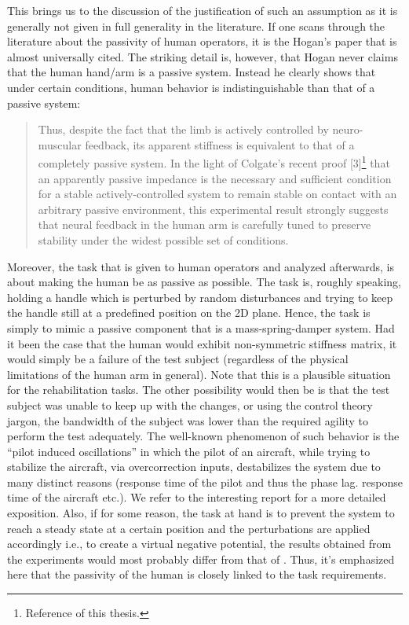 This brings us to the discussion of the justification of such an assumption as it is generally not given in full generality in the
literature. If one scans through the literature about the passivity of human operators, it is the Hogan's paper \cite{hogan89}
that is almost universally cited. The striking detail is, however, that Hogan never claims that the human hand/arm is a passive
system. Instead he clearly shows that under certain conditions, human behavior is indistinguishable than that of a 
passive system: 
\begin{quote}
Thus, despite the fact that the
limb is actively controlled by neuro-muscular feedback, its apparent
stiffness is equivalent to that of a completely passive
system. In the light of Colgate's recent proof [3]\footnote{Reference 
\cite{colgatehogan88} of this thesis.} that an
apparently passive impedance is the necessary and sufficient
condition for a stable actively-controlled system to remain stable
on contact with an arbitrary passive environment, this
experimental result strongly suggests that neural feedback in the
human arm is carefully tuned to preserve stability under the
widest possible set of conditions.
\end{quote}
Moreover, the task that is given to human operators and analyzed afterwards, is about making the human 
be as passive as possible. The task is, roughly speaking, holding a handle which is perturbed by random disturbances and 
trying to keep the handle still at a predefined position on the 2D plane. Hence, the task is simply to mimic a passive 
component that is a mass-spring-damper system. Had it been the case that the human would exhibit non-symmetric 
stiffness matrix, it would simply be a failure of the test subject (regardless of the physical limitations of the human arm in general). Note that this 
is a plausible situation for the rehabilitation tasks. The other possibility would then be is that the test subject was unable to keep up 
with the changes, or using the control theory jargon, the bandwidth of the subject was lower than the required agility to 
perform the test adequately.  The well-known phenomenon of such behavior is the ``pilot induced oscillations'' in which the pilot
of an aircraft, while trying to stabilize the aircraft, via overcorrection inputs, destabilizes the system due to many distinct reasons 
(response time of the pilot and thus the phase lag. response time of the aircraft etc.). We refer to the interesting 
report \cite{mcruer} for a more detailed exposition. Also, if for some reason, the task at hand is to prevent the system 
to reach a steady state at a certain position and the perturbations are applied accordingly i.e., to create a virtual negative potential, 
the results obtained from the experiments would most probably differ from that of \cite{mussa85}. Thus, it's emphasized here 
that the passivity of the human is closely linked to the task requirements. 



